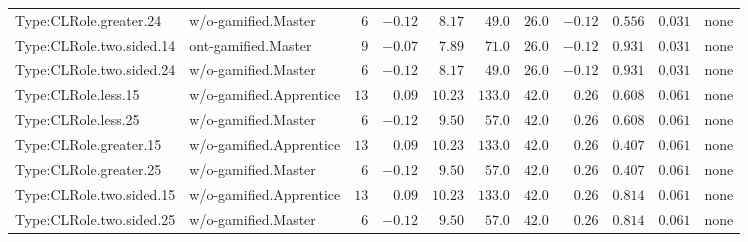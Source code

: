 \documentclass[6pt,a4paper]{article}
\begin{document}
{\begin{longtable}{llrrrrrrrrl}
Type:CLRole.greater.24&w/o-gamified.Master&$ 6$&$-0.12$&$ 8.17$&$ 49.0$&$ 26.0$&$-0.12$&$0.556$&$0.031$&none\tabularnewline
Type:CLRole.two.sided.14&ont-gamified.Master&$ 9$&$-0.07$&$ 7.89$&$ 71.0$&$ 26.0$&$-0.12$&$0.931$&$0.031$&none\tabularnewline
Type:CLRole.two.sided.24&w/o-gamified.Master&$ 6$&$-0.12$&$ 8.17$&$ 49.0$&$ 26.0$&$-0.12$&$0.931$&$0.031$&none\tabularnewline
Type:CLRole.less.15&w/o-gamified.Apprentice&$13$&$ 0.09$&$10.23$&$133.0$&$ 42.0$&$ 0.26$&$0.608$&$0.061$&none\tabularnewline
Type:CLRole.less.25&w/o-gamified.Master&$ 6$&$-0.12$&$ 9.50$&$ 57.0$&$ 42.0$&$ 0.26$&$0.608$&$0.061$&none\tabularnewline
Type:CLRole.greater.15&w/o-gamified.Apprentice&$13$&$ 0.09$&$10.23$&$133.0$&$ 42.0$&$ 0.26$&$0.407$&$0.061$&none\tabularnewline
Type:CLRole.greater.25&w/o-gamified.Master&$ 6$&$-0.12$&$ 9.50$&$ 57.0$&$ 42.0$&$ 0.26$&$0.407$&$0.061$&none\tabularnewline
\newpage
Type:CLRole.two.sided.15&w/o-gamified.Apprentice&$13$&$ 0.09$&$10.23$&$133.0$&$ 42.0$&$ 0.26$&$0.814$&$0.061$&none\tabularnewline
Type:CLRole.two.sided.25&w/o-gamified.Master&$ 6$&$-0.12$&$ 9.50$&$ 57.0$&$ 42.0$&$ 0.26$&$0.814$&$0.061$&none\tabularnewline
\hline
\end{longtable}}
\end{document}
